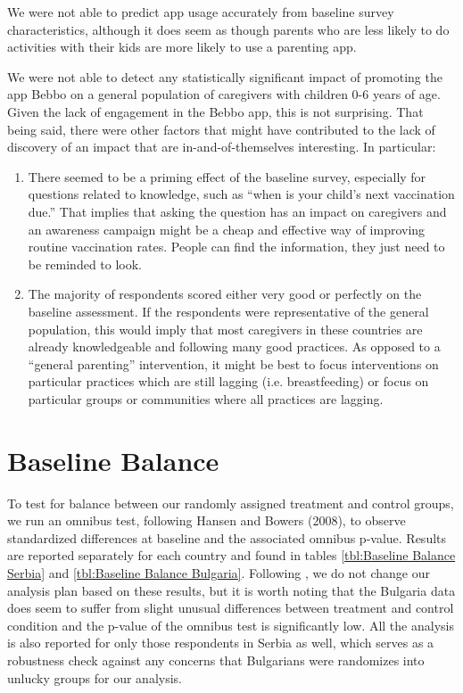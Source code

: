\documentclass{article}
\begin{document}
We were not able to predict app usage accurately from baseline survey characteristics, although it does seem as though parents who are less likely to do activities with their kids are more likely to use a parenting app. 

We were not able to detect any statistically significant impact of promoting the app Bebbo on a general population of caregivers with children 0-6 years of age. Given the lack of engagement in the Bebbo app, this is not surprising. That being said, there were other factors that might have contributed to the lack of discovery of an impact that are in-and-of-themselves interesting. In particular: 

\begin{enumerate}
\item There seemed to be a priming effect of the baseline survey, especially for questions related to knowledge, such as ``when is your child's next vaccination due.'' That implies that asking the question has an impact on caregivers and an awareness campaign might be a cheap and effective way of improving routine vaccination rates. People can find the information, they just need to be reminded to look. 
\item The majority of respondents scored either very good or perfectly on the baseline assessment. If the respondents were representative of the general population, this would imply that most caregivers in these countries are already knowledgeable and following many good practices. As opposed to a ``general parenting'' intervention, it might be best to focus interventions on particular practices which are still lagging (i.e. breastfeeding) or focus on particular groups or communities where all practices are lagging. 
\end{enumerate}



\printbibliography

\appendix



\section{Baseline Balance}

To test for balance between our randomly assigned treatment and control groups, we run an omnibus test, following Hansen and Bowers (2008), to observe standardized differences at baseline and the associated omnibus p-value. Results are reported separately for each country and found in tables \ref{tbl:Baseline Balance Serbia} and \ref{tbl:Baseline Balance Bulgaria}. Following \cite{Altman2014}, we do not change our analysis plan based on these results, but it is worth noting that the Bulgaria data does seem to suffer from slight unusual differences between treatment and control condition and the p-value of the omnibus test is significantly low. All the analysis is also reported for only those respondents in Serbia as well, which serves as a robustness check against any concerns that Bulgarians were randomizes into unlucky groups for our analysis.
\end{document}
